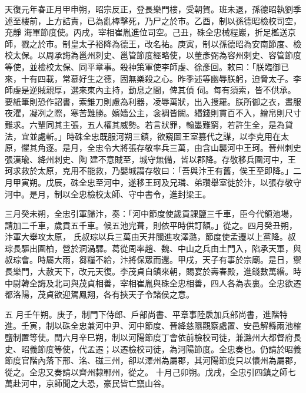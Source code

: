 \begin{pinyinscope}
 天復元年春正月甲申朔，昭宗反正，登長樂門樓，受朝賀。班未退，孫德昭執劉季述至樓前，上方詰責，已為亂棒擊死，乃尸之於市。乙酉，制以孫德昭檢校司空，充靜
 海軍節度使。丙戌，宰相崔胤進位司空。己丑，硃全忠械程巖，折足檻送京師，戮之於市。制皇太子裕降為德王，改名祐。庚寅，制以孫德昭為安南節度、檢校太保。以周承誨為邕州刺史、邕管節度經略使，以董彥弼為容州刺史、容管節度等使，並檢校太保、同平章事。殺神策軍使李師虔、徐彥回。敕曰：「朕臨御已來，十有四載，常慕好生之德，固無樂殺之心。昨季述等幽辱朕躬，迫脅太子。李師虔是逆賊親厚，選來東內主持，動息之間，俾其偵
 伺。每有須索，皆不供承。要紙筆則恐作詔書，索錐刀則慮為利器，凌辱萬狀，出入搜羅。朕所御之衣，晝服夜濯，凝冽之際，寒苦難勝。嬪嬙公主，衾裯皆闕。緡錢則貫百不入，繒帛則尺寸難求。六輩同其主張，五人權其威勢。若言狀罪，翰墨難窮，若許生全，是為貸法，宜並處斬。」時硃全忠既服河朔三鎮，欲窺圖王室篡代之謀，以李克用在太原，懼其角逐。是月，全忠令大將張存敬率兵三萬，由含山襲河中王珂。晉州刺史張漢瑜、絳州刺史、陶
 建不意賊至，城守無備，皆以郡降。存敬移兵圍河中，王珂求救於太原，克用不能救，乃嬰城謂存敬曰：「吾與汴王有舊，俟王至即降。」二月甲寅朔。戊辰，硃全忠至河中，遂移王珂及兄璘、弟瓚舉室徙於汴，以張存敬守河中。是月，制以全忠檢校太師、守中書令，進封梁王。



 三月癸未朔，全忠引軍歸汴，奏：「河中節度使歲貢課鹽三千車，臣今代領池場，請加二千車，歲貢五千車。候五池完葺，則依平時供訂額。」從之。四月癸丑朔，汴軍大舉攻太原，
 氏叔琮以兵三萬由天井關進攻澤潞，節度使孟遷以上黨降。叔琮長驅出圍柏，營於洞渦驛。葛從周率趙、魏、中山之兵由土門入，陷承天軍，與叔琮會。時屬大雨，芻糧不給，汴將保眾而還。甲戌，天子有事於宗廟。是日，禦長樂門，大赦天下，改元天復。李茂貞自鎮來朝，賜宴於壽春殿，進錢數萬緡。時中尉韓全誨及北司與茂貞相善，宰相崔胤與硃全忠相善，四人各為表裏。全忠欲遷都洛陽，茂貞欲迎駕鳳翔，各有挾天子令諸侯之意。



 五
 月壬午朔。庚子，制門下侍郎、戶部尚書、平章事陸扆加兵部尚書，進階特進。壬寅，制以硃全忠兼河中尹、河中節度、晉絳慈隰觀察處置、安邑解縣兩池榷鹽制置等使。閏六月辛巳朔，制以河陽節度丁會依前檢校司徒，兼潞州大都督府長史、昭義節度等使，代孟遷；以遷檢校司徒，為河陽節度。全忠奏也。仍請於昭義節度官階內落下邢、洺、磁三州，卻以澤州為屬郡，其河陽節度只以懷州為屬郡，從之。全忠又奏請以齊州隸鄆州，從之。
 十月己卯朔。戊戌，全忠引四鎮之師七萬赴河中，京師聞之大恐，豪民皆亡竄山谷。




\end{pinyinscope}
